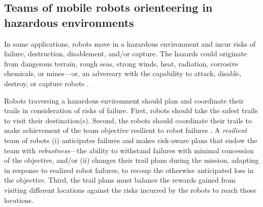 \documentclass[fleqn,10pt,lineno]{wlpeerj}
\begin{document}
\subsection{Teams of mobile robots orienteering in hazardous environments} 
In some applications, robots move in a hazardous environment \cite{trevelyan2016robotics} and incur risks of failure, destruction, disablement, and/or capture. 
The hazards could originate from dangerous terrain, rough seas, strong winds, heat, radiation, corrosive chemicals, or mines---or, an adversary with the capability to attack, disable, destroy, or capture robots \cite{agmon2017robotic}. 

Robots traversing a hazardous environment should plan and coordinate their trails in consideration of risks of failure.
First, robots should take the safest trails to visit their destination(s). 
Second, the robots should coordinate their trails to make achievement of the team objective resilient to robot failures \cite{zhou2021multi}. 
A \emph{resilient} team of robots \cite{prorok2021beyond}
(i) anticipates failures and makes risk-aware plans that endow the team with \emph{robustness}---the ability to withstand failures with minimal concession of the objective,
and/or
(ii) changes their trail plans during the mission, adapting in response to realized robot failures, to recoup the otherwise anticipated loss in the objective. 
Third, the trail plans must balance the rewards gained from visiting different locations against the risks incurred by the robots to reach those locations.
\end{document}
